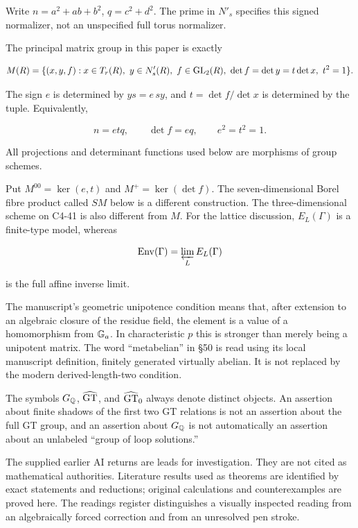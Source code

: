 Write $n=a^2+ab+b^2$, $q=c^2+d^2$.
The prime in $N'_s$ specifies this signed normalizer, not an
unspecified full torus normalizer.

The principal matrix group in this paper is exactly

$$
M(R)=\{(x,y,f):x\in T_r(R),\ y\in N'_s(R),\
 f\in\operatorname{GL}_2(R),\ \det f=\det y=t\det x,\ t^2=1\}.
$$

The sign $e$ is determined by $ys=e\,sy$, and
$t=\det f/\det x$ is determined by the tuple. Equivalently,

$$
n=etq,\qquad \det f=eq,\qquad e^2=t^2=1.
$$

All projections and determinant functions used below are
morphisms of group schemes.

Put $M^{00}=\ker(e,t)$ and $M^+=\ker(\det f)$.
The seven-dimensional Borel fibre product called $SM$ below
is a different construction. The three-dimensional scheme
on C4-41 is also different from $M$.
For the lattice discussion, $E_L(\Gamma)$ is a finite-type
model, whereas

$$
\operatorname{Env}(\Gamma)=\varprojlim_L E_L(\Gamma)
$$

is the full affine inverse limit.

The manuscript's geometric unipotence condition means that,
after extension to an algebraic closure of the residue field,
the element is a value of a homomorphism from $\mathbb G_a$.
In characteristic $p$ this is stronger than merely being a
unipotent matrix. The word ``metabelian'' in §50 is read using
its local manuscript definition, finitely generated virtually
abelian. It is not replaced by the modern derived-length-two
condition.

The symbols $G_\mathbb Q$, $\widehat{\operatorname{GT}}$, and
$\widehat{\operatorname{GT}}_0$ always denote distinct objects. An assertion
about finite shadows of the first two GT relations is not an
assertion about the full GT group, and an assertion about
$G_\mathbb Q$ is not automatically an assertion about an unlabeled
``group of loop solutions.''

The supplied earlier AI returns are leads for investigation.
They are not cited as mathematical authorities. Literature
results used as theorems are identified by exact statements
and reductions; original calculations and counterexamples
are proved here. The readings register distinguishes a
visually inspected reading from an algebraically forced
correction and from an unresolved pen stroke.
